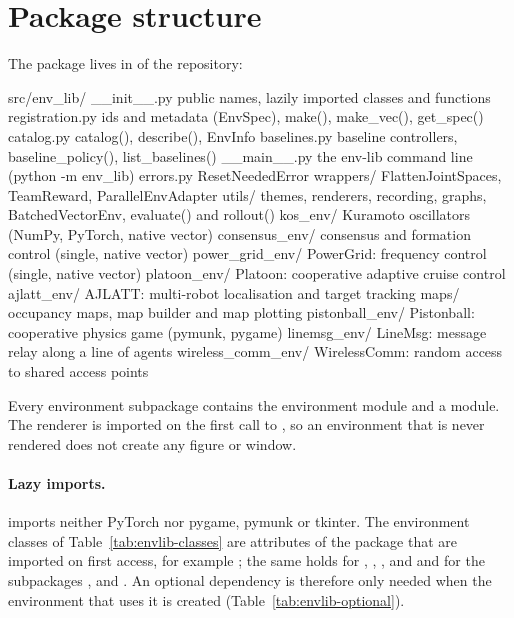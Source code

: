 \section{Package structure}\label{sec:envlib-structure}

The package lives in  of the repository:

\begin{textcode}
src/env_lib/
  __init__.py           public names, lazily imported classes and functions
  registration.py       ids and metadata (EnvSpec), make(), make_vec(), get_spec()
  catalog.py            catalog(), describe(), EnvInfo
  baselines.py          baseline controllers, baseline_policy(), list_baselines()
  __main__.py           the env-lib command line (python -m env_lib)
  errors.py             ResetNeededError
  wrappers/             FlattenJointSpaces, TeamReward, ParallelEnvAdapter
  utils/                themes, renderers, recording, graphs, BatchedVectorEnv,
                        evaluate() and rollout()
  kos_env/              Kuramoto oscillators (NumPy, PyTorch, native vector)
  consensus_env/        consensus and formation control (single, native vector)
  power_grid_env/       PowerGrid: frequency control (single, native vector)
  platoon_env/          Platoon: cooperative adaptive cruise control
  ajlatt_env/           AJLATT: multi-robot localisation and target tracking
    maps/               occupancy maps, map builder and map plotting
  pistonball_env/       Pistonball: cooperative physics game (pymunk, pygame)
  linemsg_env/          LineMsg: message relay along a line of agents
  wireless_comm_env/    WirelessComm: random access to shared access points
\end{textcode}

Every environment subpackage contains the environment module and a
 module. The renderer is imported on the first call to
, so an environment that is never rendered does not create any
figure or window.

\paragraph{Lazy imports.}  imports neither PyTorch nor
pygame, pymunk or tkinter. The environment classes of
Table~\ref{tab:envlib-classes} are attributes of the package that are imported
on first access, for example ; the same holds for
, ,
,  and 
and for the subpackages ,  and
. An optional dependency is therefore only needed when
the environment that uses it is created (Table~\ref{tab:envlib-optional}).


